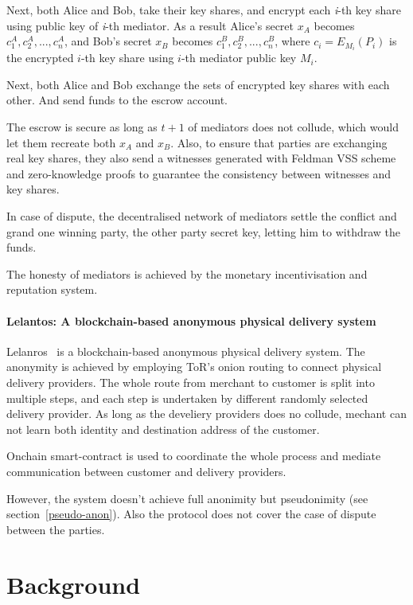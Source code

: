 \documentclass{ieeeaccess}
\begin{document}
Next, both Alice and Bob, take their key shares, and encrypt each
\textit{i}-th key share using public key of \textit{i}-th mediator. As a result
Alice's secret \(x_A\) becomes \({c^A_1, c^A_2,...,c^A_n}\), and Bob's
secret \(x_B\) becomes \({c^B_1, c^B_2,...,c^B_n}\), where
\(c_i = E_{M_i}(P_i)\) is the encrypted \(i\)-th key share using
\(i\)-th mediator public key \(M_i\).

Next, both Alice and Bob exchange the sets of encrypted key shares with
each other. And send funds to the escrow account.

The escrow is secure as long as \(t+1\) of mediators does not collude,
which would let them recreate both \(x_A\) and \(x_B\). Also, to ensure
that parties are exchanging real key shares, they also send a witnesses
generated with Feldman VSS scheme and zero-knowledge proofs to guarantee
the consistency between witnesses and key shares.

In case of dispute, the decentralised network of mediators settle the
conflict and grand one winning party, the other party secret key,
letting him to withdraw the funds.

The honesty of mediators is achieved by the monetary incentivisation and
reputation system.


\paragraph{Lelantos: A blockchain-based anonymous physical delivery
system}\label{lelantos-a-blockchain-based-anonymous-physical-delivery-system}

Lelanros~\cite{altawy2017lelantos} is a blockchain-based anonymous
physical delivery system. The anonymity is achieved by employing ToR's
onion routing to connect physical delivery providers. The whole route
from merchant to customer is split into multiple steps, and each step is
undertaken by different randomly selected delivery provider. As long as
the develiery providers does no collude, mechant can not learn both
identity and destination address of the customer.

Onchain smart-contract is used to coordinate the whole process and
mediate communication between customer and delivery providers.

However, the system doesn't achieve full anonimity but pseudonimity (see
section~\ref{pseudo-anon}). Also the protocol does not
cover the case of dispute between the parties.

\section{Background}
\end{document}
